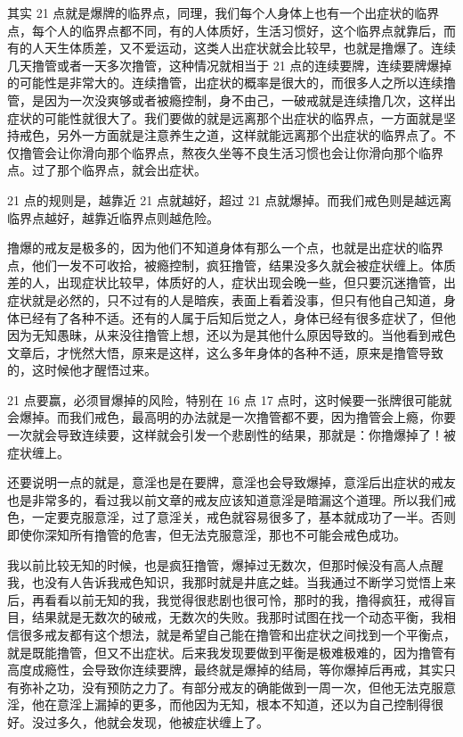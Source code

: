 \documentclass[fontset=founder]{ctexart}
\begin{document}
其实 21 点就是爆牌的临界点，同理，我们每个人身体上也有一个出症状的临界点，每个人的临界点都不同，有的人体质好，生活习惯好，这个临界点就靠后，而有的人天生体质差，又不爱运动，这类人出症状就会比较早，也就是撸爆了。连续几天撸管或者一天多次撸管，这种情况就相当于 21 点的连续要牌，连续要牌爆掉的可能性是非常大的。连续撸管，出症状的概率是很大的，而很多人之所以连续撸管，是因为一次没爽够或者被瘾控制，身不由己，一破戒就是连续撸几次，这样出症状的可能性就很大了。我们要做的就是远离那个出症状的临界点，一方面就是坚持戒色，另外一方面就是注意养生之道，这样就能远离那个出症状的临界点了。不仅撸管会让你滑向那个临界点，熬夜久坐等不良生活习惯也会让你滑向那个临界点。过了那个临界点，就会出症状。

21 点的规则是，越靠近 21 点就越好，超过 21 点就爆掉。而我们戒色则是越远离临界点越好，越靠近临界点则越危险。

撸爆的戒友是极多的，因为他们不知道身体有那么一个点，也就是出症状的临界点，他们一发不可收拾，被瘾控制，疯狂撸管，结果没多久就会被症状缠上。体质差的人，出现症状比较早，体质好的人，症状出现会晚一些，但只要沉迷撸管，出症状就是必然的，只不过有的人是暗疾，表面上看着没事，但只有他自己知道，身体已经有了各种不适。还有的人属于后知后觉之人，身体已经有很多症状了，但他因为无知愚昧，从来没往撸管上想，还以为是其他什么原因导致的。当他看到戒色文章后，才恍然大悟，原来是这样，这么多年身体的各种不适，原来是撸管导致的，这时候他才醒悟过来。

21 点要赢，必须冒爆掉的风险，特别在 16 点 17 点时，这时候要一张牌很可能就会爆掉。而我们戒色，最高明的办法就是一次撸管都不要，因为撸管会上瘾，你要一次就会导致连续要，这样就会引发一个悲剧性的结果，那就是：你撸爆掉了！被症状缠上。

还要说明一点的就是，意淫也是在要牌，意淫也会导致爆掉，意淫后出症状的戒友也是非常多的，看过我以前文章的戒友应该知道意淫是暗漏这个道理。所以我们戒色，一定要克服意淫，过了意淫关，戒色就容易很多了，基本就成功了一半。否则即使你深知所有撸管的危害，但无法克服意淫，那也不可能会戒色成功。

我以前比较无知的时候，也是疯狂撸管，爆掉过无数次，但那时候没有高人点醒我，也没有人告诉我戒色知识，我那时就是井底之蛙。当我通过不断学习觉悟上来后，再看看以前无知的我，我觉得很悲剧也很可怜，那时的我，撸得疯狂，戒得盲目，结果就是无数次的破戒，无数次的失败。我那时试图在找一个动态平衡，我相信很多戒友都有这个想法，就是希望自己能在撸管和出症状之间找到一个平衡点，就是既能撸管，但又不出症状。后来我发现要做到平衡是极难极难的，因为撸管有高度成瘾性，会导致你连续要牌，最终就是爆掉的结局，等你爆掉后再戒，其实只有弥补之功，没有预防之力了。有部分戒友的确能做到一周一次，但他无法克服意淫，他在意淫上漏掉的更多，而他因为无知，根本不知道，还以为自己控制得很好。没过多久，他就会发现，他被症状缠上了。
\end{document}
